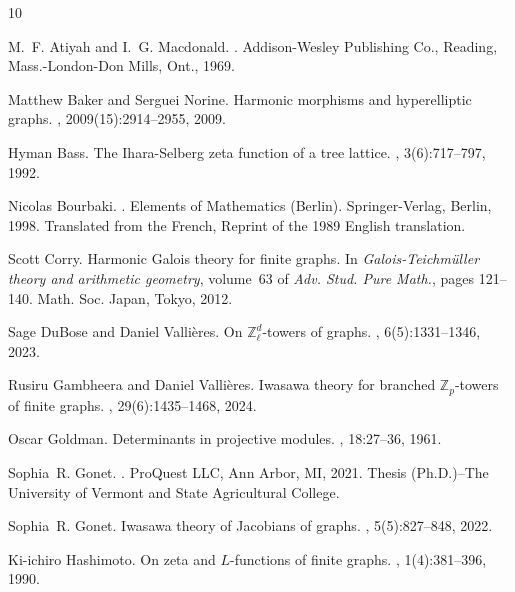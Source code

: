 \documentclass[11pt]{amsart}
\numberwithin{equation}{section}
\theoremstyle{remark}
\theoremstyle{definition}
\begin{document}
\begin{thebibliography}{10}

M.~F. Atiyah and I.~G. Macdonald.
.
\newblock Addison-Wesley Publishing Co., Reading, Mass.-London-Don Mills, Ont., 1969.

Matthew Baker and Serguei Norine.
\newblock Harmonic morphisms and hyperelliptic graphs.
, 2009(15):2914--2955, 2009.

Hyman Bass.
\newblock The {I}hara-{S}elberg zeta function of a tree lattice.
, 3(6):717--797, 1992.

Nicolas Bourbaki.
.
\newblock Elements of Mathematics (Berlin). Springer-Verlag, Berlin, 1998.
\newblock Translated from the French, Reprint of the 1989 English translation.

Scott Corry.
\newblock Harmonic {G}alois theory for finite graphs.
\newblock In {\em Galois-{T}eichm\"{u}ller theory and arithmetic geometry}, volume~63 of {\em Adv. Stud. Pure Math.}, pages 121--140. Math. Soc. Japan, Tokyo, 2012.

Sage DuBose and Daniel Valli\`eres.
\newblock On {$\mathbb Z^d_\ell$}-towers of graphs.
, 6(5):1331--1346, 2023.

Rusiru Gambheera and Daniel Valli\`eres.
\newblock Iwasawa theory for branched {$\mathbb{Z}_p$}-towers of finite graphs.
, 29(6):1435--1468, 2024.

Oscar Goldman.
\newblock Determinants in projective modules.
, 18:27--36, 1961.

Sophia~R. Gonet.
.
\newblock ProQuest LLC, Ann Arbor, MI, 2021.
\newblock Thesis (Ph.D.)--The University of Vermont and State Agricultural College.

Sophia~R. Gonet.
\newblock Iwasawa theory of {J}acobians of graphs.
, 5(5):827--848, 2022.

Ki-ichiro Hashimoto.
\newblock On zeta and {$L$}-functions of finite graphs.
, 1(4):381--396, 1990.


\end{thebibliography}
\end{document}
